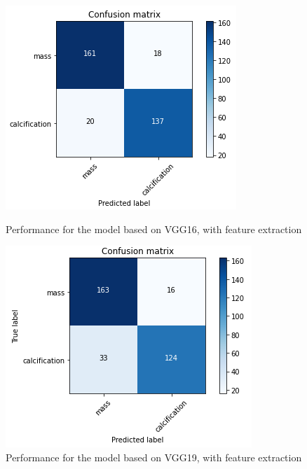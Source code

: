\documentclass[11pt,a4paper,oneside]{article}
\begin{document}
\begin{figure}[h]
	\begin{minipage}[c]{.4\textwidth}
		\centering\setlength{\captionmargin}{0pt}%
		\includegraphics[width=.9\textwidth]{images/Task 3/VGG16 3.1/FT/Conf_Matrix}
		\caption{Performance for the model based on VGG16, with feature extraction}
		\label{fig:vgg16_3.1_matrix_fe}
	\end{minipage}
	\hspace{5mm}%
	\begin{minipage}[c]{.4\textwidth}
		\centering\setlength{\captionmargin}{0pt}%
		\includegraphics[width=.9\textwidth]{images/Task 3/VGG19 3.1/FE/Conf_Matrix}
		\caption{Performance for the model based on VGG19, with feature extraction}
		\label{fig:vgg19_3.1_matrix_fe}
	\end{minipage}
\end{figure}
\end{document}
